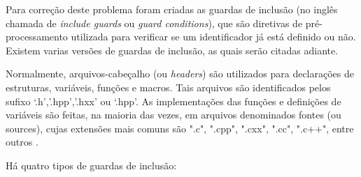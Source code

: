 Para correção deste problema foram criadas as guardas de inclusão 
(no inglês chamada de  \textit{include guards} ou \textit{guard conditions}),
 que são diretivas de pré-processamento utilizada para verificar se um
 identificador já está definido ou não. Existem varias versões de guardas
 de inclusão, as quais serão citadas adiante\cite{ref42}.

Normalmente, arquivos-cabeçalho (ou \textit{headers}) são utilizados para
 declarações de estruturas, variáveis, funções e macros. Tais arquivos são
 identificados pelos sufixo ‘.h’,’.hpp’,’.hxx’ ou ‘.hpp’. As implementações
 das funções e definições de variáveis são feitas, na maioria das vezes, em
 arquivos denominados fontes (ou sources), cujas extensões mais comuns são
 ".c", ".cpp", ".cxx", ".cc", ".c++", entre outros \cite{gcc-sufix}.

Há quatro tipos de guardas de inclusão:


